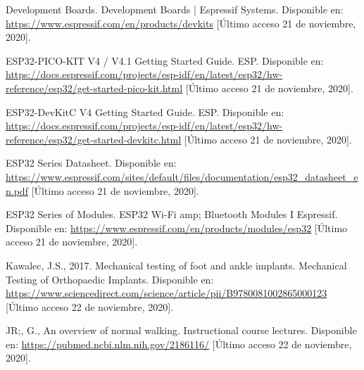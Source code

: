\begin{thebibliography}{99}
 Development Boards. Development Boards | Espressif Systems. Disponible en: \url{https://www.espressif.com/en/products/devkits} [Último acceso 21 de noviembre, 2020].

 ESP32-PICO-KIT V4 / V4.1 Getting Started Guide. ESP. Disponible en: \url{https://docs.espressif.com/projects/esp-idf/en/latest/esp32/hw-reference/esp32/get-started-pico-kit.html} [Último acceso 21 de noviembre, 2020].

 ESP32-DevKitC V4 Getting Started Guide. ESP. Disponible en: \url{https://docs.espressif.com/projects/esp-idf/en/latest/esp32/hw-reference/esp32/get-started-devkitc.html} [Último acceso 21 de noviembre, 2020].

 ESP32 Series Datasheet. Disponible en: \url{https://www.espressif.com/sites/default/files/documentation/esp32_datasheet_en.pdf} [Último acceso 21 de noviembre, 2020].

 ESP32 Series of Modules. ESP32 Wi-Fi amp; Bluetooth Modules I Espressif. Disponible en: \url{https://www.espressif.com/en/products/modules/esp32} [Último acceso 21 de noviembre, 2020].

 Kawalec, J.S., 2017. Mechanical testing of foot and ankle implants. Mechanical Testing of Orthopaedic Implants. Disponible en: \url{https://www.sciencedirect.com/science/article/pii/B9780081002865000123} [Último acceso 22 de noviembre, 2020].

 JR;, G., An overview of normal walking. Instructional course lectures. Disponible en: \url{https://pubmed.ncbi.nlm.nih.gov/2186116/} [Último acceso 22 de noviembre, 2020].

\end{thebibliography}
